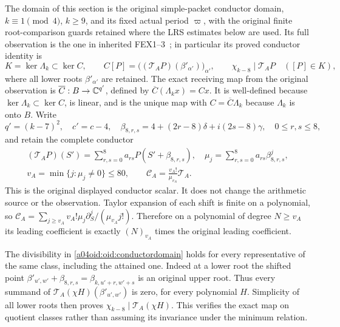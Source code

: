 The domain of this section is the original simple-packet conductor
domain, $k\equiv1\pmod4$, $k\ge9$, and its fixed actual period
$\varpi$, with the original finite root-comparison guards retained
where the LRS estimates below are used. Its full observation is the
one in inherited FEX1--3~\cite{a04oid:InheritedFEX}; in particular its
proved conductor identity is
\begin{equation}\label{a04oid:oid:conductordomain}
 K=\ker\Lambda_k\subset\ker C,
 \qquad C[P]=\bigl((\mathcal T_AP)(\beta'_{\alpha'})\bigr)_{\alpha'},
 \qquad \chi_{k-8}\mid\mathcal T_AP\quad([P]\in K),
\end{equation}
where all lower roots $\beta'_{\alpha'}$ are retained.
The exact receiving map from the original observation is
$\overline C:B\to\mathbb C^{q'}$, defined by
$\overline C(\Lambda_kx)=Cx$. It is well-defined because
$\ker\Lambda_k\subset\ker C$, is linear, and is the unique map
with $C=\overline C\Lambda_k$ because $\Lambda_k$ is onto $B$.
Write
\[
 q'=(k-7)^2,\quad c'=c-4,\quad
 \beta_{8,r,s}=4+(2r-8)\delta+i(2s-8)\gamma,
 \quad 0\le r,s\le8,
\]
and retain the complete conductor
\begin{equation}\label{a04oid:oid:conductoroperator}
 \begin{gathered}
 (\mathcal T_AP)(S')=\sum_{r,s=0}^8a_{rs}P(S'+\beta_{8,r,s}),
 \quad \mu_j=\sum_{r,s=0}^8a_{rs}\beta_{8,r,s}^j,\\
 v_A=\min\{j:\mu_j\ne0\}\le80,
 \qquad \mathcal C_A=\frac{v_A!}{\mu_{v_A}}\mathcal T_A.
 \end{gathered}
\end{equation}
This is the original displayed conductor scalar. It does not change
the arithmetic source or the observation. Taylor expansion of each
shift is finite on a polynomial, so
$\mathcal C_A=\sum_{j\ge v_A}v_A!\mu_j
\partial_S^j/(\mu_{v_A}j!)$. Therefore on a polynomial of degree
$N\ge v_A$ its leading coefficient is exactly $(N)_{v_A}$ times
the original leading coefficient.

The divisibility in \eqref{a04oid:oid:conductordomain} holds for every
representative of the same class, including the attained one.
Indeed at a lower root the shifted point
$\beta'_{u',w'}+\beta_{8,r,s}=\beta_{k,u'+r,w'+s}$ is an original
upper root. Thus every summand of
$\mathcal T_A(\chi H)(\beta'_{u',w'})$ is zero, for every polynomial
$H$. Simplicity of all lower roots then proves
$\chi_{k-8}\mid\mathcal T_A(\chi H)$. This verifies the exact map
on quotient classes rather than assuming its invariance under the
minimum relation.

